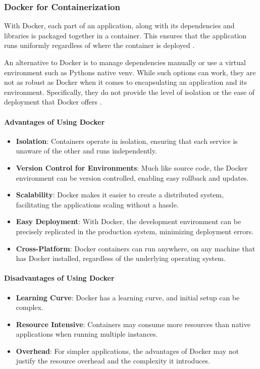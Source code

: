 \subsubsection{Docker for
Containerization}\label{docker-for-containerization}

With Docker, each part of an application, along with its dependencies
and libraries is packaged together in a container. This ensures that the
application runs uniformly regardless of where the container is deployed
\cite{35}.

An alternative to Docker is to manage dependencies manually or use a
virtual environment such as Python\textquotesingle s native venv. While
such options can work, they are not as robust as Docker when it comes to
encapsulating an application and its environment. Specifically, they do
not provide the level of isolation or the ease of deployment that Docker
offers \cite{36}.

\paragraph{Advantages of Using Docker}\label{advantages-of-using-docker}

\begin{itemize}
\item
  \textbf{Isolation}: Containers operate in isolation, ensuring that
  each service is unaware of the other and runs independently.
\item
  \textbf{Version Control for Environments}: Much like source code, the
  Docker environment can be version controlled, enabling easy rollback
  and updates.
\item
  \textbf{Scalability}: Docker makes it easier to create a distributed
  system, facilitating the application\textquotesingle s scaling without
  a hassle.
\item
  \textbf{Easy Deployment}: With Docker, the development environment can
  be precisely replicated in the production system, minimizing
  deployment errors.
\item
  \textbf{Cross-Platform}: Docker containers can run anywhere, on any
  machine that has Docker installed, regardless of the underlying
  operating system.
\end{itemize}

\paragraph{Disadvantages of Using
Docker}\label{disadvantages-of-using-docker}

\begin{itemize}
\item
  \textbf{Learning Curve}: Docker has a learning curve, and initial
  setup can be complex.
\item
  \textbf{Resource Intensive}: Containers may consume more resources
  than native applications when running multiple instances.
\item
  \textbf{Overhead}: For simpler applications, the advantages of Docker
  may not justify the resource overhead and the complexity it
  introduces.
\end{itemize}
